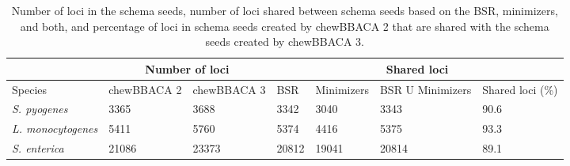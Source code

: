 \begin{table}[h!]
    \caption{Number of loci in the schema seeds, number of loci shared between schema seeds based on the BSR, minimizers, and both, and percentage of loci in schema seeds created by chewBBACA 2 that are shared with the schema seeds created by chewBBACA 3.}
    \label{tab:ch2_tableS2}
    \centering
    \begin{tabular}{@{}lllllll@{}}
    \toprule
    \multicolumn{1}{|c|}{} & \multicolumn{2}{|c|}{Number of loci} & \multicolumn{4}{|c|}{Shared loci} \\ \midrule
    Species & chewBBACA 2 & chewBBACA 3 & BSR & Minimizers & BSR U Minimizers & Shared loci (\%) \\ \midrule
    \textit{S. pyogenes} & 3365 & 3688 & 3342 & 3040 & 3343 & 90.6 \\
    \textit{L. monocytogenes} & 5411 & 5760 & 5374 & 4416 & 5375 & 93.3 \\
    \textit{S. enterica} & 21086 & 23373 & 20812 & 19041 & 20814 & 89.1 \\
    \bottomrule
    \end{tabular}
\end{table}